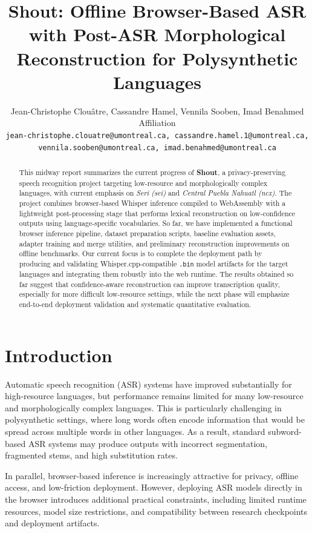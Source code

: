 \documentclass[11pt]{article}
\title{Shout: Offline Browser-Based ASR with Post-ASR Morphological Reconstruction for Polysynthetic Languages}
\author{Jean-Christophe Clouâtre, Cassandre Hamel, Vennila Sooben, Imad Benahmed \\
Affiliation\\
\texttt{jean-christophe.clouatre@umontreal.ca, cassandre.hamel.1@umontreal.ca,}\\
\texttt{vennila.sooben@umontreal.ca, imad.benahmed@umontreal.ca}}
\begin{document}
\maketitle

\begin{abstract}
This midway report summarizes the current progress of \textbf{Shout}, a privacy-preserving speech recognition project targeting low-resource and morphologically complex languages, with current emphasis on \textit{Seri (sei)} and \textit{Central Puebla Nahuatl (ncx)}. The project combines browser-based Whisper inference compiled to WebAssembly with a lightweight post-processing stage that performs lexical reconstruction on low-confidence outputs using language-specific vocabularies. So far, we have implemented a functional browser inference pipeline, dataset preparation scripts, baseline evaluation assets, adapter training and merge utilities, and preliminary reconstruction improvements on offline benchmarks. Our current focus is to complete the deployment path by producing and validating Whisper.cpp-compatible \texttt{.bin} model artifacts for the target languages and integrating them robustly into the web runtime. The results obtained so far suggest that confidence-aware reconstruction can improve transcription quality, especially for more difficult low-resource settings, while the next phase will emphasize end-to-end deployment validation and systematic quantitative evaluation.
\end{abstract}

\section{Introduction}
Automatic speech recognition (ASR) systems have improved substantially for high-resource languages, but performance remains limited for many low-resource and morphologically complex languages. This is particularly challenging in polysynthetic settings, where long words often encode information that would be spread across multiple words in other languages. As a result, standard subword-based ASR systems may produce outputs with incorrect segmentation, fragmented stems, and high substitution rates.

In parallel, browser-based inference is increasingly attractive for privacy, offline access, and low-friction deployment. However, deploying ASR models directly in the browser introduces additional practical constraints, including limited runtime resources, model size restrictions, and compatibility between research checkpoints and deployment artifacts.
\end{document}
